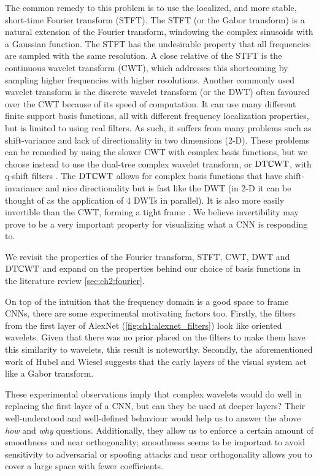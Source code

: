 The common remedy to this problem is to use the localized, and more
stable, short-time Fourier transform (STFT). The STFT (or the Gabor transform)
is a natural extension of the Fourier transform, windowing the complex sinusoids
with a Gaussian function. The STFT has the undesirable property that all
frequencies are sampled with the same resolution. A close relative of the STFT is the 
continuous wavelet transform (CWT), which addresses this shortcoming by 
sampling higher frequencies with higher resolutions. Another commonly used
wavelet transform is the discrete wavelet transform (or the DWT) often favoured over 
the CWT because of its speed of computation. It can use many
different finite support basis functions, all with different frequency
localization properties, but is limited to using real filters. As such, it
suffers from many problems such as shift-variance and lack of directionality in
two dimensions (2-D). These problems can be remedied by using the slower CWT with complex basis
functions, but we choose instead to use the dual-tree complex wavelet transform,
or $\mathrm{DT}\mathbb{C}\mathrm{WT}$, \cite{selesnick_dual-tree_2005} with q-shift filters \cite{kingsbury_complex_2001}. 
The $\mathrm{DT}\mathbb{C}\mathrm{WT}$ allows for complex basis functions that have shift-invariance and
nice directionality but is fast like the DWT (in 2-D it can be thought of as the
application of 4 DWTs in parallel). It is also more easily invertible than the
CWT, forming a tight frame \cite{kovacevic_introduction_2008}. We believe
invertibility may prove to be a very important property for visualizing what a
CNN is responding to.

We revisit the properties of the Fourier transform, STFT, CWT, DWT and $\mathrm{DT}\mathbb{C}\mathrm{WT}$
and expand on the properties behind our choice of basis functions 
in the literature review \autoref{sec:ch2:fourier}.

On top of the intuition that the frequency domain is a good space to frame CNNs,
there are some experimental motivating factors too. Firstly, the filters from
the first layer of AlexNet (\autoref{fig:ch1:alexnet_filters}) look like
oriented wavelets. Given that there was no prior placed on the filters to make
them have this similarity to wavelets, this result is noteworthy. Secondly, the
aforementioned work of Hubel and Wiesel suggests that the early layers of the
visual system act like a Gabor transform.

These experimental observations imply that complex wavelets would do well in
replacing the first layer of a CNN, but can they be used at deeper layers? Their
well-understood and well-defined behaviour would help us to answer the above
\emph{how} and \emph{why} questions. Additionally, they allow us to enforce a
certain amount of smoothness and near orthogonality; smoothness seems to be
important to avoid sensitivity to adversarial or spoofing attacks
\cite{szegedy_intriguing_2014} and near orthogonality allows you to cover a
large space with fewer coefficients.

